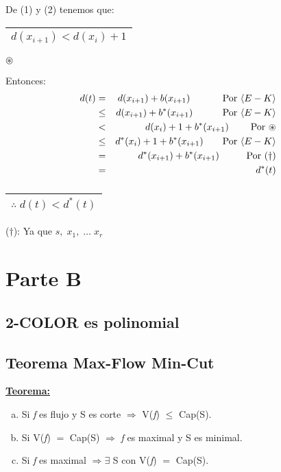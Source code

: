 \documentclass[12pt,a4paper]{report}
\begin{document}
\begin{enumerate}
\begin{enumerate}[a)]
				\vspace{5mm}
				De (1) y (2) tenemos que: \begin{tabular}{|c|} \hline $d(x_{i+1}) < d(x_{i}) +1 $ \\ \hline \end{tabular} $\circledast$
			
				Entonces:
				\begin{eqnarray}
				\nonumber d(t) & = & d(x_{i+1}) + b(x_{i+1}) \qquad\;\;\;\;\;\textup{Por }\langle E-K \rangle\\
				\nonumber & \leq & d(x_{i+1}) + b^{*}(x_{i+1}) \qquad\;\;\;\;\textup{Por }\langle E-K \rangle\\
				\nonumber & < & d(x_{i}) +1 + b^{*}(x_{i+1}) \qquad\;\textup{Por } \circledast \\
				\nonumber & \leq & d^{*}(x_{i}) + 1 + b^{*}(x_{i+1}) \qquad\textup{Por }\langle E-K \rangle \\
				\nonumber & = & d^{*}(x_{i+1}) + b^{*}(x_{i+1}) \qquad\;\;\;\textup{Por } (\dag) \\
				\nonumber & = & d^{*}(t)
				\end{eqnarray}
				$\qquad\qquad\qquad\;\;\;$
				\begin{tabular}{|c|} \hline $\therefore \; d(t) < d^{*}(t)$ \\ \hline \end{tabular}

				($\dag$): Ya que $s, \; x_{1}, \; \dotsc \; x_{r}$
			\end{enumerate}
		\end{enumerate}
	
	

\chapter{Parte B}

	\section{2-COLOR es polinomial}
	
	
	\section{Teorema Max-Flow Min-Cut}
		\textbf{\underline{Teorema:}}
		\begin{enumerate}[a)]
			\item Si \textit{f} es flujo y S es corte $\Rightarrow$ V(\textit{f}) $\leq$ Cap(S).
			\item Si V(\textit{f}) $=$ Cap(S) $\Rightarrow$ \textit{f} es maximal y S es minimal.
			\item Si \textit{f} es maximal $\Rightarrow \exists$ S con V(\textit{f}) $=$ Cap(S).
		\end{enumerate}
		
\end{document}
